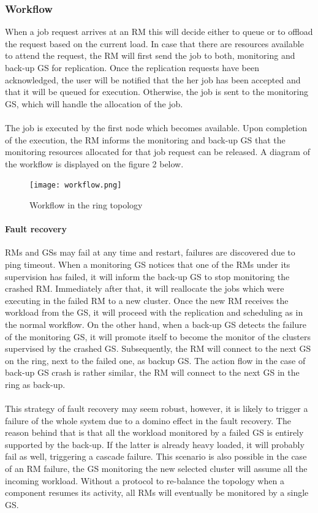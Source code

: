 \subsubsection{Workflow}
When a job request arrives at an RM this will decide either to queue or to offload the request based on the current load. 
In case that there are resources available to attend the request, the RM will first send the job to both, monitoring and back-up GS for replication. Once the replication requests have been acknowledged, the user will be notified that the her job has been accepted and that it will be queued for execution. Otherwise, the job is sent to the monitoring GS, which will handle the allocation of the job.
\\\\
The job is executed by the first node which becomes available. Upon completion of the execution, the RM informs the monitoring and back-up GS that the monitoring resources allocated for that job request can be released. A diagram of the workflow is displayed on the figure 2 below.
\\
\begin{figure}[H]
\centering
	\texttt{[image: workflow.png]}
	\caption{Workflow in the ring topology}
\end{figure}

\paragraph{Fault recovery}
RMs and GSs may fail at any time and restart, failures are discovered due to ping timeout. When a monitoring GS notices that one of the RMs under its supervision has failed, it will inform the back-up GS to stop monitoring the crashed RM. Immediately after that, it will reallocate the jobs which were executing in the failed RM to a new cluster. Once the new RM receives the workload from the GS, it will proceed with the replication and scheduling as in the normal workflow. On the other hand, when a back-up GS detects the failure of the monitoring GS, it will promote itself to become the monitor of the clusters supervised by the crashed GS. Subsequently, the RM will connect to the next GS on the ring, next to the failed one, as backup GS. The action flow in the case of back-up GS crash is rather similar, the RM will connect to the next GS in the ring as back-up.
\\\\
This strategy of fault recovery may seem robust, however, it is likely to trigger a failure of the whole system due to a domino effect in the fault recovery. The reason behind that is that all the workload monitored by a failed GS is entirely supported by the back-up. If the latter is already heavy loaded, it will probably fail as well, triggering a cascade failure. This scenario is also possible in the case of an RM failure, the GS monitoring the new selected cluster will assume all the incoming workload. Without a protocol to re-balance the topology when a component resumes its activity, all RMs will eventually be monitored by a single GS.

